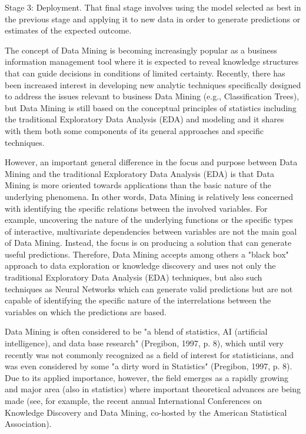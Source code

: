 \documentclass[]{report}
\begin{document}
Stage 3: Deployment. That final stage involves using the model selected as best in the previous stage and applying it to new data in order to generate predictions or estimates of the expected outcome.

The concept of Data Mining is becoming increasingly popular as a business information management tool where it is expected to reveal knowledge structures that can guide decisions in conditions of limited certainty. Recently, there has been increased interest in developing new analytic techniques specifically designed to address the issues relevant to business Data Mining (e.g., Classification Trees), but Data Mining is still based on the conceptual principles of statistics including the traditional Exploratory Data Analysis (EDA) and modeling and it shares with them both some components of its general approaches and specific techniques.

However, an important general difference in the focus and purpose between Data Mining and the traditional Exploratory Data Analysis (EDA) is that Data Mining is more oriented towards applications than the basic nature of the underlying phenomena. In other words, Data Mining is relatively less concerned with identifying the specific relations between the involved variables. For example, uncovering the nature of the underlying functions or the specific types of interactive, multivariate dependencies between variables are not the main goal of Data Mining. Instead, the focus is on producing a solution that can generate useful predictions. Therefore, Data Mining accepts among others a "black box" approach to data exploration or knowledge discovery and uses not only the traditional Exploratory Data Analysis (EDA) techniques, but also such techniques as Neural Networks which can generate valid predictions but are not capable of identifying the specific nature of the interrelations between the variables on which the predictions are based.

Data Mining is often considered to be "a blend of statistics, AI (artificial intelligence), and data base research" (Pregibon, 1997, p. 8), which until very recently was not commonly recognized as a field of interest for statisticians, and was even considered by some "a dirty word in Statistics" (Pregibon, 1997, p. 8). Due to its applied importance, however, the field emerges as a rapidly growing and major area (also in statistics) where important theoretical advances are being made (see, for example, the recent annual International Conferences on Knowledge Discovery and Data Mining, co-hosted by the American Statistical Association).
\end{document}
